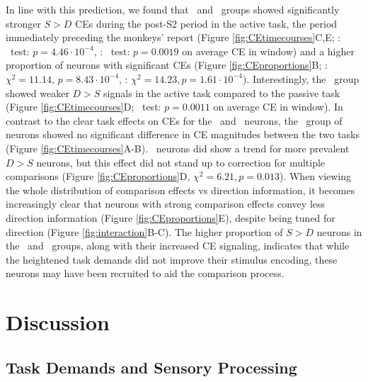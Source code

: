 In line with this prediction, we found that \suppressed\ and \consistent\ groups showed significantly stronger $S>D$ CEs during the post-S2 period in the active task, the period immediately preceding the monkeys' report (Figure \ref{fig:CEtimecourses}C,E; \suppressed: \kst\ test: $p=4.46 \cdot 10^{-4}$, \consistent: \kst\ test: $p=0.0019$ on average CE in window) and a higher proportion of neurons with significant CEs (Figure \ref{fig:CEproportions}B; \suppressed: $\chi^2=11.14$, $p=8.43\cdot 10^{-4}$, \consistent: $\chi^2=14.23, p=1.61 \cdot 10^{-4}$).
Interestingly, the \suppressed\ group showed weaker $D>S$ signals in the active task compared to the passive task (Figure \ref{fig:CEtimecourses}D; \kst\ test: $p=0.0011$ on average CE in window).
In contrast to the clear task effects on CEs for the \suppressed\ and \consistent\ neurons, the \enhanced\ group of neurons showed no significant difference in CE magnitudes between the two tasks (Figure \ref{fig:CEtimecourses}A-B). \enhanced\ neurons did show a trend for more prevalent $D>S$ neurons, but this effect did not stand up to correction for multiple comparisons (Figure \ref{fig:CEproportions}D, $\chi^2=6.21, p=0.013$).\label{rev:ceTrend} When viewing the whole distribution of comparison effects vs direction information, it becomes increasingly clear that neurons with strong comparison effects convey less direction information (Figure \ref{fig:CEproportions}E), despite being tuned for direction (Figure \ref{fig:interaction}B-C).
The higher proportion of $S>D$ neurons in the \suppressed\ and \consistent\ groups, along with their increased CE signaling, indicates that while the heightened task demands did not improve their stimulus encoding, these neurons may have been recruited to aid the comparison process.


\section{Discussion}
\glsresetall

\subsection*{Task Demands and Sensory Processing}

